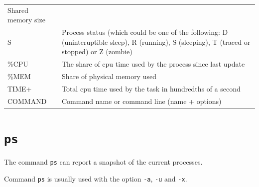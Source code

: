 \documentclass[]{book}
\begin{document}
\begin{longtable}[]{@{}ll@{}}
\begin{minipage}[t]{0.89\columnwidth}
Shared memory size\strut
\end{minipage}\tabularnewline
\begin{minipage}[t]{0.05\columnwidth}\raggedright
S\strut
\end{minipage} & \begin{minipage}[t]{0.89\columnwidth}\raggedright
Process status (which could be one of the following: D (uninteruptible sleep), R (running), S (sleeping), T (traced or stopped) or Z (zombie)\strut
\end{minipage}\tabularnewline
\begin{minipage}[t]{0.05\columnwidth}\raggedright
\%CPU\strut
\end{minipage} & \begin{minipage}[t]{0.89\columnwidth}\raggedright
The share of cpu time used by the process since last update\strut
\end{minipage}\tabularnewline
\begin{minipage}[t]{0.05\columnwidth}\raggedright
\%MEM\strut
\end{minipage} & \begin{minipage}[t]{0.89\columnwidth}\raggedright
Share of physical memory used\strut
\end{minipage}\tabularnewline
\begin{minipage}[t]{0.05\columnwidth}\raggedright
TIME+\strut
\end{minipage} & \begin{minipage}[t]{0.89\columnwidth}\raggedright
Total cpu time used by the task in hundredths of a second\strut
\end{minipage}\tabularnewline
\begin{minipage}[t]{0.05\columnwidth}\raggedright
COMMAND\strut
\end{minipage} & \begin{minipage}[t]{0.89\columnwidth}\raggedright
Command name or command line (name + options)\strut
\end{minipage}\tabularnewline
\bottomrule
\end{longtable}

\hypertarget{ps}{%
\section{\texorpdfstring{\texttt{ps}}{ps}}\label{ps}}

The command \texttt{ps} can report a snapshot of the current processes.

Command \texttt{ps} is usually used with the option \texttt{-a}, \texttt{-u} and \texttt{-x}.
\end{document}
